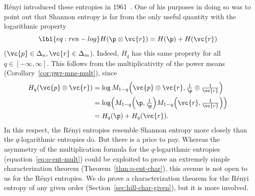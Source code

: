 R\'enyi introduced these entropies in 1961~\cite{Reny}.  One of his
purposes in doing so was to point out that Shannon entropy is far from the
only useful quantity with the logarithmic property
% 
\begin{equation}
\lbl{eq:ren-log}
H(\p \otimes \vc{r}) = H(\p) + H(\vc{r})
\end{equation}
% 
($\vc{p} \in \Delta_n, \vc{r} \in \Delta_m$).  Indeed, $H_q$ has this same
property for all $q \in [-\infty, \infty]$.  This follows from the
multiplicativity of the power means (Corollary~\ref{cor:pwr-mns-mult}),
since
% 
\begin{align*}
H_q(\vc{p} \otimes \vc{r})      &
=
\log M_{1 - q} \Bigl(\vc{p} \otimes \vc{r}, 
\tfrac{1}{\p} \otimes \tfrac{1}{\vc{r}} \Bigr)  \\
&
=
\log \Bigl(
M_{1 - q} \Bigl( \p, \tfrac{1}{\p} \Bigr)
M_{1 - q} \Bigl( \vc{r}, \tfrac{1}{\vc{r}} \Bigr)
\Bigr)  \\
&
=
H_q(\p) + H_q(\vc{r}).
\end{align*}
% 
In this respect, the R\'enyi entropies resemble Shannon entropy more
closely than the $q$-logarithmic entropies do.  But there is a price to
pay.  Whereas the asymmetry of the multiplication formula for the
$q$-logarithmic entropies (equation~\eqref{eq:q-ent-mult}) could be exploited
to prove an extremely simple characterization theorem
(Theorem~\ref{thm:q-ent-char}), this avenue is not open to us for the
R\'enyi entropies.  We do prove a characterization theorem for the R\'enyi
entropy of any given order (Section~\ref{sec:hill-char-given}), but it is
more involved.

